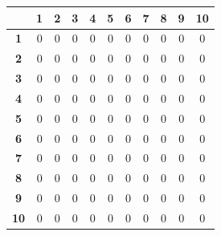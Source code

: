 \documentclass[a4paper,14pt]{extarticle}
\begin{document}
\begin{enumerate}[label=1.\arabic*.]
\begin{enumerate}[1) ]
\begin{tabular}{|c|c|c|c|c|c|c|c|c|c|c|}
			            \hline
			                              & \textbf{1} & \textbf{2} & \textbf{3} & \textbf{4} & \textbf{5} & \textbf{6} & \textbf{7} & \textbf{8} & \textbf{9} & \textbf{10} \\
			            \hline\textbf{1}  & 0          & 0          & 0          & 0          & 0          & 0          & 0          & 0          & 0          & 0           \\
			            \hline\textbf{2}  & 0          & 0          & 0          & 0          & 0          & 0          & 0          & 0          & 0          & 0           \\
			            \hline\textbf{3}  & 0          & 0          & 0          & 0          & 0          & 0          & 0          & 0          & 0          & 0           \\
			            \hline\textbf{4}  & 0          & 0          & 0          & 0          & 0          & 0          & 0          & 0          & 0          & 0           \\
			            \hline\textbf{5}  & 0          & 0          & 0          & 0          & 0          & 0          & 0          & 0          & 0          & 0           \\
			            \hline\textbf{6}  & 0          & 0          & 0          & 0          & 0          & 0          & 0          & 0          & 0          & 0           \\
			            \hline\textbf{7}  & 0          & 0          & 0          & 0          & 0          & 0          & 0          & 0          & 0          & 0           \\
			            \hline\textbf{8}  & 0          & 0          & 0          & 0          & 0          & 0          & 0          & 0          & 0          & 0           \\
			            \hline\textbf{9}  & 0          & 0          & 0          & 0          & 0          & 0          & 0          & 0          & 0          & 0           \\
			            \hline\textbf{10} & 0          & 0          & 0          & 0          & 0          & 0          & 0          & 0          & 0          & 0           \\
			            \hline
		            \end{tabular}


\end{enumerate}
\end{enumerate}
\end{document}
